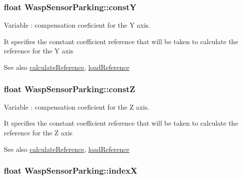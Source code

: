 \subsubsection[{\texorpdfstring{constY}{constY}}]{\setlength{\rightskip}{0pt plus 5cm}float Wasp\+Sensor\+Parking\+::constY}\hypertarget{class_wasp_sensor_parking_a1b4300f89f26d8d8a0c104ce16a21181}{}\label{class_wasp_sensor_parking_a1b4300f89f26d8d8a0c104ce16a21181}


Variable \+: compensation coeficient for the Y axis. 

It specifies the constant coefficient reference that will be taken to calculate the reference for the Y axis \begin{DoxySeeAlso}{See also}
\hyperlink{class_wasp_sensor_parking_a8fe1255a714fed88684a89363963eb02}{calculate\+Reference}, \hyperlink{class_wasp_sensor_parking_ada85f8d26b42a4a6733c0e1d1880a4ad}{load\+Reference} 
\end{DoxySeeAlso}
\subsubsection[{\texorpdfstring{constZ}{constZ}}]{\setlength{\rightskip}{0pt plus 5cm}float Wasp\+Sensor\+Parking\+::constZ}\hypertarget{class_wasp_sensor_parking_aa0af7fe7d7661cf7f36f162d92e834f0}{}\label{class_wasp_sensor_parking_aa0af7fe7d7661cf7f36f162d92e834f0}


Variable \+: compensation coeficient for the Z axis. 

It specifies the constant coefficient reference that will be taken to calculate the reference for the Z axis \begin{DoxySeeAlso}{See also}
\hyperlink{class_wasp_sensor_parking_a8fe1255a714fed88684a89363963eb02}{calculate\+Reference}, \hyperlink{class_wasp_sensor_parking_ada85f8d26b42a4a6733c0e1d1880a4ad}{load\+Reference} 
\end{DoxySeeAlso}
\subsubsection[{\texorpdfstring{indexX}{indexX}}]{\setlength{\rightskip}{0pt plus 5cm}float Wasp\+Sensor\+Parking\+::indexX}\hypertarget{class_wasp_sensor_parking_a02772d82b8822128cced1a7b596286b0}{}\label{class_wasp_sensor_parking_a02772d82b8822128cced1a7b596286b0}


